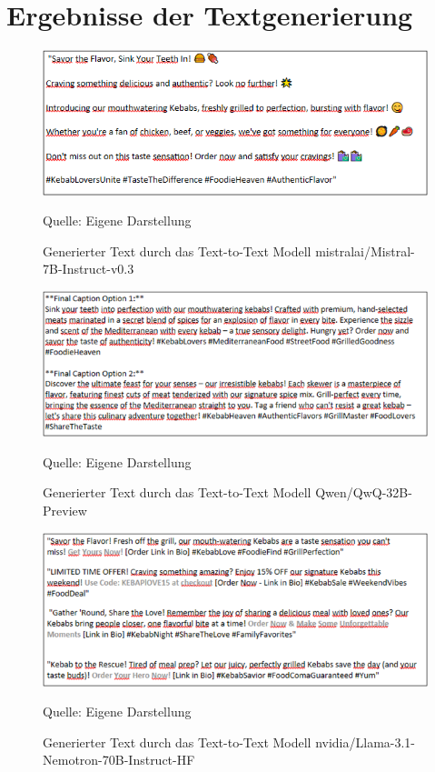 \newpage
\section{Ergebnisse der Textgenerierung}\label{sec:bilder-textergebnisse}

\begin{figure}[htbp]
    \centering
    \includegraphics[width=\textwidth]{abbildungen/textresult_mistral}
    \caption[]{Generierter Text durch das Text-to-Text Modell mistralai/Mistral-7B-Instruct-v0.3}
    \label{fig:textresult_mistral}
    \raggedright Quelle: Eigene Darstellung
\end{figure}
\newpage

\begin{figure}[htbp]
    \centering
    \includegraphics[width=\textwidth]{abbildungen/textresult_Qwen}
    \caption[]{Generierter Text durch das Text-to-Text Modell Qwen/QwQ-32B-Preview}
    \label{fig:textresult_Qwen}
    \raggedright Quelle: Eigene Darstellung
\end{figure}
\newpage

\begin{figure}[htbp]
    \centering
    \includegraphics[width=\textwidth]{abbildungen/textresult_nvdia_nemotron}
    \caption[]{Generierter Text durch das Text-to-Text Modell nvidia/Llama-3.1-Nemotron-70B-Instruct-HF}
    \label{fig:textresult_nvdia_nemotron}
    \raggedright Quelle: Eigene Darstellung
\end{figure}
\clearpage
